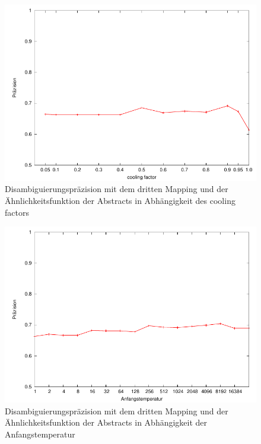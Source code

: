 \begin{figure}[tbh]
\includegraphics[height=0.4\textheight]{img/pdf/mapping3/cooling_factor.pdf}
\caption[]{Disambiguierungspräzision mit dem dritten Mapping und der Ähnlichkeitsfunktion der Abstracts in Abhängigkeit des cooling factors}
\label{fig:disambiguierung_evaluierung_mapping3_cooling_factor}
\end{figure}

\begin{figure}[tbh]
\includegraphics[height=0.4\textheight]{img/pdf/mapping3/starting_temperature.pdf}
\caption[]{Disambiguierungspräzision mit dem dritten Mapping und der Ähnlichkeitsfunktion der Abstracts in Abhängigkeit der Anfangstemperatur}
\label{fig:disambiguierung_evaluierung_mapping3_starting_temperature}
\end{figure}

